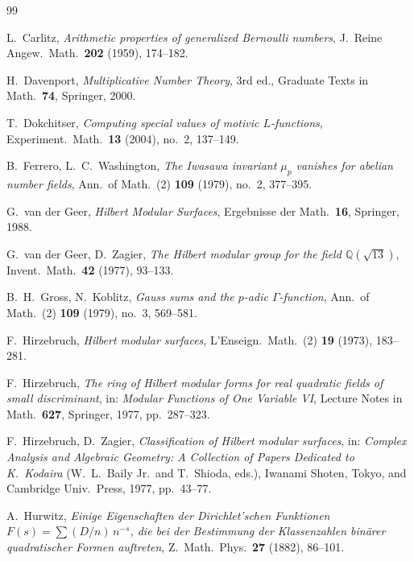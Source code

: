 \documentclass[11pt,reqno]{amsart}
\theoremstyle{plain}
\theoremstyle{definition}
\newcommand{\Q}{\mathbb{Q}}
\begin{document}
\bigskip

\begin{thebibliography}{99}

 L.~Carlitz, \emph{Arithmetic properties of
generalized Bernoulli numbers}, J.~Reine Angew.~Math.\ \textbf{202}
(1959), 174--182.

 H.~Davenport, \emph{Multiplicative Number
Theory}, 3rd ed., Graduate Texts in Math.\ \textbf{74}, Springer,
2000.

 T.~Dokchitser, \emph{Computing special
values of motivic $L$-functions}, Experiment.\ Math.\ \textbf{13}
(2004), no.~2, 137--149.

 B.~Ferrero, L.~C.~Washington, \emph{The
Iwasawa invariant $\mu_{p}$ vanishes for abelian number fields},
Ann.\ of Math.\ (2) \textbf{109} (1979), no.~2, 377--395.

 G.~van der Geer, \emph{Hilbert Modular
Surfaces}, Ergebnisse der Math.\ \textbf{16}, Springer, 1988.

 G.~van der Geer, D.~Zagier, \emph{The
Hilbert modular group for the field $\Q(\sqrt{13})$}, Invent.\ Math.\
\textbf{42} (1977), 93--133.

 B.~H.~Gross, N.~Koblitz, \emph{Gauss
sums and the $p$-adic $\Gamma$-function}, Ann.\ of Math.\ (2)
\textbf{109} (1979), no.~3, 569--581.

 F.~Hirzebruch, \emph{Hilbert modular surfaces},
L'Enseign.\ Math.\ (2) \textbf{19} (1973), 183--281.

 F.~Hirzebruch, \emph{The ring of Hilbert
modular forms for real quadratic fields of small discriminant},
in: \emph{Modular Functions of One Variable VI}, Lecture Notes in
Math.\ \textbf{627}, Springer, 1977, pp.\ 287--323.

 F.~Hirzebruch, D.~Zagier, \emph{Classification
of Hilbert modular surfaces}, in: \emph{Complex Analysis and
Algebraic Geometry: A Collection of Papers Dedicated to K.\
Kodaira} (W.~L.~Baily Jr.\ and T.~Shioda, eds.), Iwanami Shoten,
Tokyo, and Cambridge Univ.\ Press, 1977, pp.\ 43--77.

 A.~Hurwitz, \emph{Einige Eigenschaften der
Dirichlet'schen Funktionen $F(s)=\sum (D/n)\,n^{-s}$, die bei
der Bestimmung der Klassenzahlen bin\"arer quadratischer Formen
auftreten}, Z.~Math.\ Phys.\ \textbf{27} (1882), 86--101.


\end{thebibliography}
\end{document}
